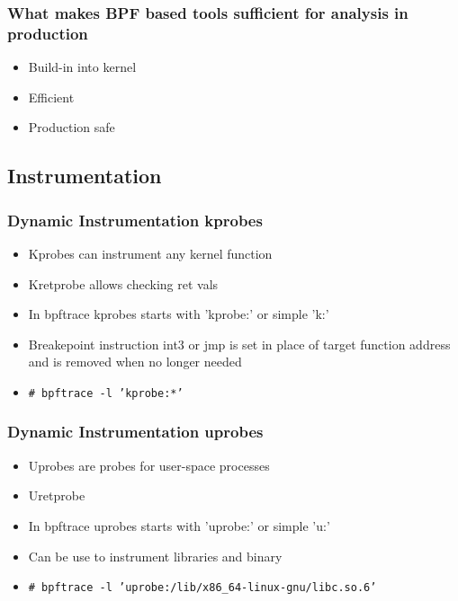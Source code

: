\documentclass{beamer}
\begin{document}
\begin{frame}
  \frametitle{What makes BPF based tools sufficient for analysis in production}
	\begin{Large}
  \begin{itemize}
		\item<+-> Build-in into kernel
    \item<+-> Efficient 
		\item<+-> Production safe 
	\end{itemize}
	\end{Large}
\end{frame}

\subsection{Instrumentation}

\begin{frame}
  \frametitle{Dynamic Instrumentation kprobes}

	\begin{Large}
  \begin{itemize}
    \item<1-> Kprobes can instrument any kernel function
		\item<2-> Kretprobe allows checking ret vals
		\item<3-> In bpftrace kprobes starts with 'kprobe:' or simple 'k:'
    \item<4-> Breakepoint instruction int3 or jmp is set in place of target function address and is removed when no longer needed
    \item<5-> {\scriptsize \texttt{\# bpftrace -l 'kprobe:*'}}
	\end{itemize}	
\end{Large}
\end{frame}

\begin{frame}
  \frametitle{Dynamic Instrumentation uprobes}
	\begin{Large}
  \begin{itemize}
    \item<1-> Uprobes are probes for user-space processes
		\item<2-> Uretprobe
		\item<3-> In bpftrace uprobes starts with 'uprobe:' or simple 'u:'
		\item<4-> Can be use to instrument libraries and binary
    \item<5-> {\scriptsize \texttt{\# bpftrace -l 'uprobe:/lib/x86\_64-linux-gnu/libc.so.6' }}
	\end{itemize}	
\end{Large}
\end{frame}
\end{document}
